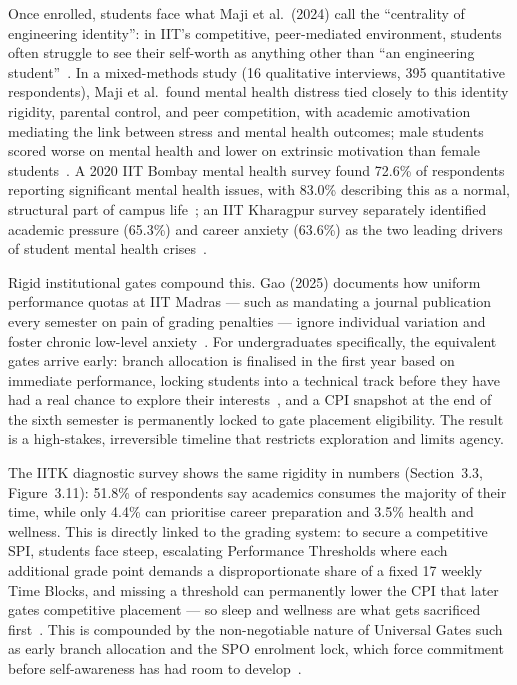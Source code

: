 Once enrolled, students face what Maji et al.\ (2024) call the ``centrality of engineering identity'': in IIT's competitive, peer-mediated environment, students often struggle to see their self-worth as anything other than ``an engineering student''~\cite{Maji-2024}. In a mixed-methods study (16 qualitative interviews, 395 quantitative respondents), Maji et al.\ found mental health distress tied closely to this identity rigidity, parental control, and peer competition, with academic amotivation mediating the link between stress and mental health outcomes; male students scored worse on mental health and lower on extrinsic motivation than female students~\cite{Maji-2024}. A 2020 IIT Bombay mental health survey found 72.6\% of respondents reporting significant mental health issues, with 83.0\% describing this as a normal, structural part of campus life~\cite{Yasar-2026}; an IIT Kharagpur survey separately identified academic pressure (65.3\%) and career anxiety (63.6\%) as the two leading drivers of student mental health crises~\cite{Carkit-2025}.

Rigid institutional gates compound this. Gao (2025) documents how uniform performance quotas at IIT Madras --- such as mandating a journal publication every semester on pain of grading penalties --- ignore individual variation and foster chronic low-level anxiety~\cite{Chandrasekera-2024}. For undergraduates specifically, the equivalent gates arrive early: branch allocation is finalised in the first year based on immediate performance, locking students into a technical track before they have had a real chance to explore their interests~\cite{Maji-2024}, and a CPI snapshot at the end of the sixth semester is permanently locked to gate placement eligibility. The result is a high-stakes, irreversible timeline that restricts exploration and limits agency.

The IITK diagnostic survey shows the same rigidity in numbers (Section~3.3, Figure~3.11): 51.8\% of respondents say academics consumes the majority of their time, while only 4.4\% can prioritise career preparation and 3.5\% health and wellness. This is directly linked to the grading system: to secure a competitive SPI, students face steep, escalating Performance Thresholds where each additional grade point demands a disproportionate share of a fixed 17 weekly Time Blocks, and missing a threshold can permanently lower the CPI that later gates competitive placement --- so sleep and wellness are what gets sacrificed first~\cite{Maji-2024}. This is compounded by the non-negotiable nature of Universal Gates such as early branch allocation and the SPO enrolment lock, which force commitment before self-awareness has had room to develop~\cite{Maji-2024, Chandrasekera-2024}.

